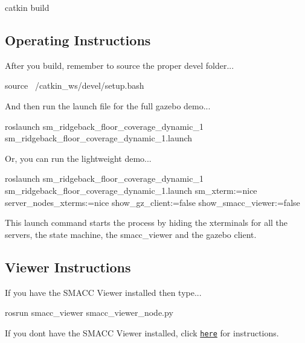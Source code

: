 \begin{DoxyCode}
catkin build
\end{DoxyCode}
 \subsection*{Operating Instructions}

After you build, remember to source the proper devel folder...


\begin{DoxyCode}
source ~/catkin\_ws/devel/setup.bash
\end{DoxyCode}


And then run the launch file for the full gazebo demo...


\begin{DoxyCode}
roslaunch sm\_ridgeback\_floor\_coverage\_dynamic\_1 sm\_ridgeback\_floor\_coverage\_dynamic\_1.launch
\end{DoxyCode}


Or, you can run the lightweight demo...


\begin{DoxyCode}
roslaunch sm\_ridgeback\_floor\_coverage\_dynamic\_1 sm\_ridgeback\_floor\_coverage\_dynamic\_1.launch sm\_xterm:=nice
       server\_nodes\_xterms:=nice show\_gz\_client:=false show\_smacc\_viewer:=false
\end{DoxyCode}


This launch command starts the process by hiding the xterminals for all the servers, the state machine, the smacc\+\_\+viewer and the gazebo client.

\subsection*{Viewer Instructions}

If you have the S\+M\+A\+CC Viewer installed then type...


\begin{DoxyCode}
rosrun smacc\_viewer smacc\_viewer\_node.py
\end{DoxyCode}


If you don\textquotesingle{}t have the S\+M\+A\+CC Viewer installed, click \href{http://smacc.ninja/smacc-viewer/}{\tt here} for instructions. 